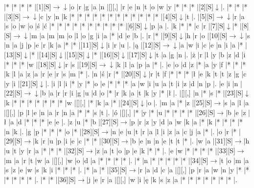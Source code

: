 \documentclass[11pt]{article}
\newcommand\drarr{$\rightarrow \!\!\!\!\! \downarrow$}
\newcommand\rarr{$\rightarrow$}
\newcommand\darr{$\downarrow$}
\begin{document}
\noindent\begin{Puzzle}{21}{21}|*	|*	|*	|*	|[1][S]\drarr	|o	|r	|g	|a	|n	|[][,]{ }	|r	|e	|n	|t	|o	|w	|y	|*	|*	|*	|[2][S]\darr	|.
|*	|*	|*	|[3][S]\drarr	|c	|y	|n	|k	|*	|*	|*	|*	|*	|*	|*	|*	|*	|*	|*	|*	|[4][S]\darr	|t	|.
|[5][S]\drarr	|r	|a	|s	|o	|w	|o	|ś	|ć	|*	|*	|*	|*	|*	|*	|*	|*	|*	|*	|[6][S]\darr	|p	|a	|.
|k	|*	|*	|c	|r	|[7][S]\darr	|*	|[8][S]\drarr	|m	|a	|m	|m	|o	|l	|o	|g	|i	|a	|*	|d	|e	|b	|.
|r	|*	|[9][S]\darr	|h	|r	|o	|[10][S]\drarr	|s	|n	|a	|j	|p	|e	|r	|k	|a	|*	|*	|[11][S]\darr	|i	|r	|u	|.
|ą	|[12][S]\drarr	|a	|w	|i	|c	|e	|n	|i	|a	|*	|[13][S]\darr	|*	|[14][S]\darr	|[15][S]\darr	|*	|[16][S]\darr	|[17][S]\darr	|t	|a	|g	|n	|.
|ż	|r	|l	|y	|b	|z	|d	|i	|*	|*	|*	|w	|[18][S]\darr	|r	|s	|[19][S]\drarr	|k	|l	|a	|p	|a	|*	|.
|e	|o	|d	|z	|*	|a	|y	|f	|*	|*	|*	|k	|l	|a	|z	|a	|r	|e	|r	|s	|m	|*	|.
|n	|ś	|r	|*	|[20][S]\darr	|r	|t	|f	|*	|*	|*	|ł	|e	|k	|t	|t	|z	|g	|c	|y	|i	|[21][S]\darr	|.
|i	|l	|i	|*	|y	|*	|o	|e	|*	|*	|*	|a	|w	|i	|u	|a	|t	|i	|z	|d	|n	|p	|.
|e	|i	|n	|[22][S]\drarr	|b	|a	|r	|r	|i	|g	|u	|d	|o	|*	|r	|k	|a	|t	|k	|y	|*	|ł	|.
|[][,]{ }	|n	|*	|s	|*	|[23][S]\darr	|k	|*	|*	|*	|*	|*	|*	|*	|w	|[][,]{ }	|*	|k	|a	|*	|[24][S]\darr	|o	|.
|m	|a	|*	|z	|[25][S]\rarr	|s	|a	|l	|a	|[][,]{ }	|p	|l	|e	|n	|a	|r	|n	|a	|*	|*	|s	|t	|.
|ó	|[][,]{ }	|*	|y	|*	|u	|*	|*	|*	|*	|[26][S]\rarr	|b	|e	|z	|ł	|a	|d	|*	|*	|*	|e	|e	|.
|z	|u	|*	|b	|[27][S]\rarr	|p	|r	|z	|y	|d	|a	|w	|k	|a	|*	|k	|*	|*	|*	|*	|n	|k	|.
|g	|p	|*	|*	|*	|o	|*	|[28][S]\rarr	|n	|e	|u	|t	|r	|a	|l	|i	|z	|a	|c	|j	|a	|*	|.
|o	|r	|*	|[29][S]\rarr	|k	|r	|u	|p	|i	|e	|c	|*	|*	|[30][S]\rarr	|b	|e	|n	|n	|e	|t	|t	|*	|.
|w	|a	|[31][S]\rarr	|h	|u	|t	|y	|r	|a	|*	|*	|*	|[32][S]\rarr	|z	|a	|t	|o	|p	|e	|k	|*	|*	|.
|e	|w	|*	|*	|*	|*	|[33][S]\rarr	|m	|a	|r	|t	|w	|a	|[][,]{ }	|w	|o	|d	|a	|*	|*	|*	|*	|.
|*	|n	|*	|*	|*	|*	|*	|[34][S]\rarr	|t	|o	|m	|a	|s	|z	|e	|w	|s	|k	|i	|*	|*	|*	|.
|*	|a	|*	|[35][S]\rarr	|r	|a	|d	|c	|a	|[][,]{ }	|p	|r	|a	|w	|n	|y	|*	|*	|*	|*	|*	|*	|.
|*	|*	|[36][S]\rarr	|j	|e	|r	|a	|[][,]{ }	|w	|i	|ę	|k	|s	|z	|a	|*	|*	|*	|*	|*	|*	|*	|.\end{Puzzle}

\newpage
\end{document}
